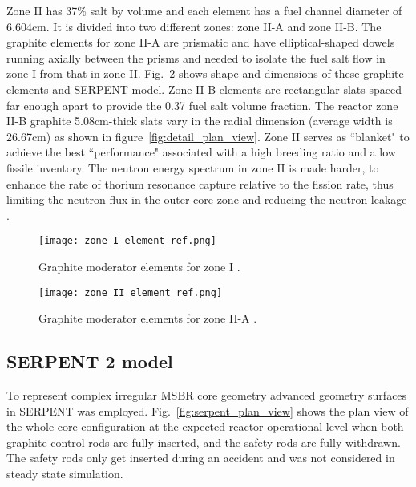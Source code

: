 Zone II has 37\% salt by volume and each element has a fuel channel 
diameter of 6.604cm. It is divided into two different zones: zone II-A and zone 
II-B. The graphite elements for zone II-A are prismatic and have elliptical-shaped dowels running axially between the prisms and needed to isolate the fuel salt flow in zone I from that in zone II. Fig.~\ref{fig:II_element_ref} shows shape and dimensions of these graphite elements and SERPENT model. Zone II-B elements are rectangular slats spaced far enough apart to provide the 0.37 fuel salt volume fraction. The reactor zone II-B graphite 5.08cm-thick slats vary in the radial dimension (average width is 26.67cm) as shown in figure~\ref{fig:detail_plan_view}. Zone II serves as ``blanket" to achieve the best ``performance" associated with a high breeding ratio and a low fissile inventory. The neutron energy spectrum in zone II is made harder, to enhance the rate of thorium resonance capture relative to the fission rate, thus limiting the neutron flux in the outer core zone and reducing the neutron leakage \cite{robertson_conceptual_1971}. 

\begin{figure}[hbp!] %
  \centering
  \vspace{-0.3em}
  \texttt{[image: zone\_I\_element\_ref.png]}
  \caption{Graphite moderator elements for zone I \cite{robertson_conceptual_1971,rykhlevskii_full-core_2017}.}
  \vspace{-0.6em}
  \label{fig:I_element_ref}
\end{figure}
\FloatBarrier

\begin{figure}[hbp!] %
  \centering
  \vspace{-0.3em}
  \texttt{[image: zone\_II\_element\_ref.png]}
  \caption{Graphite moderator elements for zone II-A \cite{robertson_conceptual_1971,rykhlevskii_full-core_2017}.}
  \vspace{-0.6em}
  \label{fig:II_element_ref}
\end{figure}
\FloatBarrier

\subsection{SERPENT 2 model}

To represent complex irregular \gls{MSBR} core geometry advanced geometry surfaces in SERPENT was employed. Fig.~\ref{fig:serpent_plan_view} shows the plan view of the whole-core configuration at the expected reactor operational level when both graphite control rods are fully inserted, and the safety rods are fully withdrawn. The safety rods only get inserted during an accident and was not considered in steady state simulation. 

